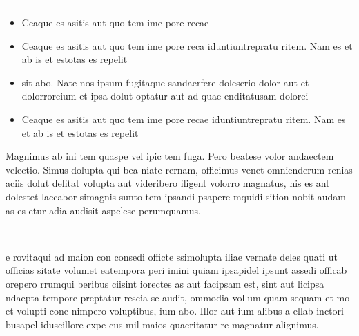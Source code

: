 \documentclass{beamer}
\begin{document}
\begin{frame}[t]

  \vspace*{1cm}


  \begin{appendixblock}
    \begin{minipage}[c]{.48\linewidth}
      \centering
      \color{fzjblue}\rule{0.9\linewidth}{0.2\paperheight}
    \end{minipage}
    \hfill
    \begin{minipage}[c]{.48\linewidth}
      \begin{itemize}
      \item Ceaque es asitis aut quo tem ime pore recae
      \item Ceaque es asitis aut quo tem ime pore reca
        iduntiuntrepratu ritem. Nam es et ab is et estotas es repelit
      \item sit abo. Nate nos ipsum fugitaque sandaerfere doleserio
        dolor aut et dolorroreium et ipsa dolut optatur aut ad quae
        enditatusam dolorei
      \item Ceaque es asitis aut quo tem ime pore recae
        iduntiuntrepratu ritem. Nam es et ab is et estotas es repelit
      \end{itemize}
    \end{minipage}
  \end{appendixblock}

  Magnimus ab ini tem quaspe vel ipic tem fuga. Pero beatese volor
  andaectem velectio. Simus dolupta qui bea niate rernam, officimus
  venet omnienderum renias aciis dolut delitat volupta aut videribero
  iligent volorro magnatus, nis es ant dolestet laccabor simagnis
  sunto tem ipsandi psapere mquidi sition nobit audam as es etur adia
  audisit aspelese perumquamus.\\[1.5ex]

  \begin{columns}[onlytextwidth]
    \begin{column}{.49\linewidth}
      \textbf{}\\
      e rovitaqui ad maion con consedi officte ssimolupta iliae
      vernate deles quati ut officias sitate volumet eatempora peri
      imini quiam ipsapidel ipsunt assedi officab orepero rrumqui
      beribus ciisint iorectes as aut facipsam est, sint aut licipsa
      ndaepta tempore preptatur rescia se audit, ommodia vollum quam
      sequam et mo et volupti cone nimpero voluptibus, ium abo. Illor
      aut ium alibus a ellab inctori busapel iduscillore expe cus mil
      maios quaeritatur re magnatur alignimus.\\[1ex]


\end{column}
\end{columns}
\end{frame}
\end{document}
